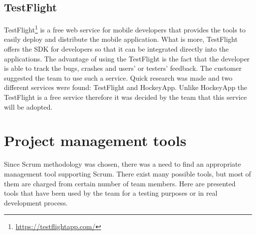 
\subsection{TestFlight}
\label{subsec:testflight}
TestFlight\footnote{\url{https://testflightapp.com/}} is a free web service for mobile developers that provides the tools to easily deploy and distribute the mobile application. 
What is more, TestFlight offers the SDK for developers so that it can be integrated directly into the applications. 
The advantage of using the TestFlight is the fact that the developer is able to track the bugs, crashes and users' or testers' feedback. 
The customer suggested the team to use such a service.
Quick research was made and two different services were found: TestFlight and HockeyApp. Unlike HockeyApp the TestFlight is a free service therefore it was decided by the team that this service will be adopted.


\section{Project management tools}
\label{sec:management_tools}
Since Scrum methodology was chosen, there was a need to find an appropriate management tool supporting Scrum.
There exist many possible tools, but most of them are charged from
certain number of team members. 
Here are presented tools that have been used by the team for a testing purposes or in real development process.


